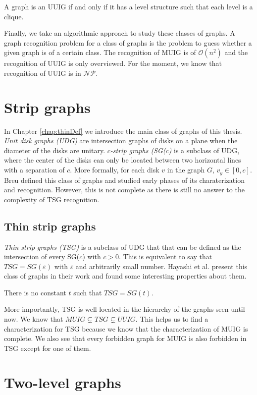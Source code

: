 \begin{_theo}
  A graph is an UUIG if and only if it has a level structure such that each level is a clique.
\end{_theo}

Finally, we take an algorithmic approach to study these classes of graphs. A graph recognition problem for a class of graphs is the problem to guess whether a given graph is of a certain class. The recognition of MUIG is of $\mathcal{O}(n^2)$ \cite{talonCompletionMixedUnit2014} and the recognition of UUIG is only overviewed. For the moment, we know that recognition of UUIG is in $\mathcal{NP}$.

\section*{Strip graphs}

In Chapter \ref{chap:thinDef} we introduce the main class of graphs of this thesis. \emph{Unit disk graphs (UDG)} are intersection graphs of disks on a plane when the diameter of the disks are unitary. \emph{$c$-strip graphs (SG($c$)} \cite{breuAlgorithmicAspectsConstrained1996} is a subclass of UDG, where the center of the disks can only be located between two horizontal lines with a separation of $c$. More formally, for each disk $v$ in the graph $G$, $v_y \in [0,c]$. Breu \cite{breuAlgorithmicAspectsConstrained1996} defined this class of graphs and studied early phases of its charaterization and recognition. However, this is not complete as there is still no answer to the complexity of TSG recognition.


\subsection*{Thin strip graphs}

\emph{Thin strip graphs (TSG)} is a subclass of UDG that that can be defined as the intersection of every SG($c$) with $c > 0$. This is equivalent to say that $TSG = SG(\varepsilon)$ with $\varepsilon$ and arbitrarily small number. Hayashi et al. \cite{hayashiThinStripGraphs2017} present this class of graphs in their work and found some interesting properties about them.

\begin{_theo}
  There is no constant $t$ such that $TSG = SG(t)$.
\end{_theo}

More importantly, TSG is well located in the hierarchy of the graphs seen until now. We know that $MUIG \subsetneq TSG \subsetneq UUIG$. This helps us to find a characterization for TSG because we know that the characterization of MUIG is complete. We also see that every forbidden graph for MUIG is also forbidden in TSG except for one of them.

\section*{Two-level graphs}
